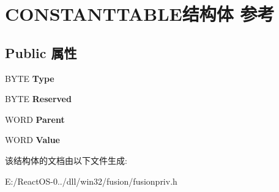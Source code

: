 \hypertarget{struct_c_o_n_s_t_a_n_t_t_a_b_l_e}{}\section{C\+O\+N\+S\+T\+A\+N\+T\+T\+A\+B\+L\+E结构体 参考}
\label{struct_c_o_n_s_t_a_n_t_t_a_b_l_e}
\subsection*{Public 属性}
\begin{DoxyCompactItemize}
\item 
\mbox{\label{struct_c_o_n_s_t_a_n_t_t_a_b_l_e_ab9b039029cebef4e09c691616e33cbfa}} 
B\+Y\+TE {\bfseries Type}
\item 
\mbox{\label{struct_c_o_n_s_t_a_n_t_t_a_b_l_e_aeed0f0ec8506b105b9542e9944f9b996}} 
B\+Y\+TE {\bfseries Reserved}
\item 
\mbox{\label{struct_c_o_n_s_t_a_n_t_t_a_b_l_e_a9637b0d2e9eeaf998a537016f699fe5f}} 
W\+O\+RD {\bfseries Parent}
\item 
\mbox{\label{struct_c_o_n_s_t_a_n_t_t_a_b_l_e_ac5ef3f74eefb4573116d2f2fd4be5dc2}} 
W\+O\+RD {\bfseries Value}
\end{DoxyCompactItemize}


该结构体的文档由以下文件生成\+:\begin{DoxyCompactItemize}
\item 
E\+:/\+React\+O\+S-\/0../dll/win32/fusion/fusionpriv.\+h\end{DoxyCompactItemize}
